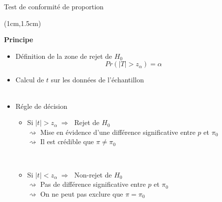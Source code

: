 \documentclass{beamer}
\begin{document}
\begin{frame}{Test de conformité de proportion}
\begin{textblock*}{\textwidth}(1cm,1.5cm)

\begin{center}{\bf \Large Principe  } \end{center}

\begin{itemize}
\item Définition de la zone de rejet de $H_0$
$$
Pr(|T|>z_{\alpha}) = \alpha
$$
\item Calcul de $t$ sur les données de l'échantillon \\

\

\item Régle de décision 
\begin{itemize}
\item Si $|t| > z_{\alpha} \; \Rightarrow \; $ Rejet de $H_0$ \\
$\rightsquigarrow$ Mise en évidence d'une différence significative entre $p$ et $\pi_0$ \\
$\rightsquigarrow$ Il est crédible que $\pi\neq\pi_0$

\
\item Si $|t| < z_{\alpha} \; \Rightarrow \; $ Non-rejet de $H_0$ \\

$\rightsquigarrow$ Pas de différence significative entre $p$ et $\pi_0$ \\
$\rightsquigarrow$ On ne peut pas exclure que $\pi = \pi_0$

\end{itemize}
\end{itemize}
\end{textblock*}

\end{frame}

\end{document}

